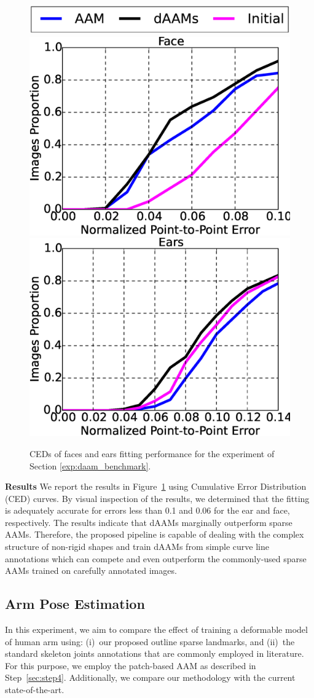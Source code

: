 \begin{figure}[b!]
    \vspace{-5pt}
    \centering
    \includegraphics[width=0.6\columnwidth]{resources/DAAMBenchmark/legend}
    \\
    \includegraphics[width=0.48\columnwidth]{resources/DAAMBenchmark/face}
    \includegraphics[width=0.48\columnwidth]{resources/DAAMBenchmark/ear}
    \caption{CEDs of faces and ears fitting performance for the experiment of Section \ref{exp:daam_benchmark}.}
    \label{fig:daam_benchmark}
\end{figure}

\noindent\textbf{Results} We report the results in Figure~\ref{fig:daam_benchmark} using Cumulative Error Distribution (CED) curves. By visual inspection of the results, we determined that the fitting is adequately accurate for errors less than 0.1 and 0.06 for the ear and face, respectively. The results indicate that dAAMs marginally outperform sparse AAMs. Therefore, the proposed pipeline is capable of dealing with the complex structure of non-rigid shapes and train dAAMs from simple curve line annotations which can compete and even outperform the commonly-used sparse AAMs trained on carefully annotated images.


\subsection{Arm Pose Estimation}
\label{exp:benchmark}
In this experiment, we aim to compare the effect of training a deformable model of human arm using: (i)~our proposed outline sparse landmarks, and (ii)~the standard skeleton joints annotations that are commonly employed in literature. For this purpose, we employ the patch-based AAM as described in Step~\ref{sec:step4}. Additionally, we compare our methodology with the current state-of-the-art.


